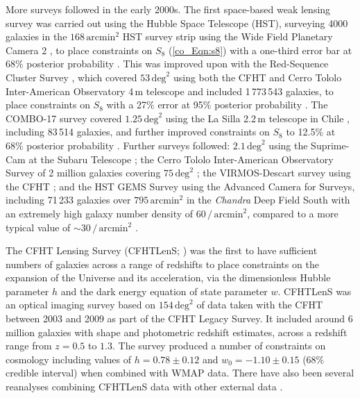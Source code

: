 More surveys followed in the early 2000s. The first space-based weak lensing survey was carried out using the Hubble Space Telescope (HST), surveying 4000 galaxies in the $168\,\text{arcmin}^2$ HST survey strip using the Wide Field Planetary Camera 2 \citep{Griffiths1990}, to place constraints on $S_8$ (\autoref{co_Eqn:s8}) with a one-third error bar at 68\% posterior probability \citep{Rhodes2001}. This was improved upon with the Red-Sequence Cluster Survey \citep{Gladders2001}, which covered $53\,\text{deg}^2$ using both the CFHT and Cerro Tololo Inter-American Observatory 4\,m telescope and included 1\,773\,543 galaxies, to place constraints on $S_8$ with a 27\% error at 95\% posterior probability \citep{Hoekstra2002a, Hoekstra2002b}. The COMBO-17 survey covered $1.25\,\text{deg}^2$ using the La Silla 2.2\,m telescope in Chile \citep{Wolf2001}, including 83\,514 galaxies, and further improved constraints on $S_8$ to 12.5\% at 68\% posterior probability \citep{Brown2003}. Further surveys followed: $2.1\,\text{deg}^2$ using the Suprime-Cam \citep{Miyazaki2002} at the Subaru Telescope \citep{Hamana2003}; the Cerro Tololo Inter-American Observatory Survey of 2 million galaxies covering $75\,\text{deg}^2$ \citep{Jarvis2003}; the VIRMOS-Descart survey using the CFHT \citep{VanWaerbeke2005}; and the HST GEMS Survey using the Advanced Camera for Surveys, including 71\,233 galaxies over $795\,\text{arcmin}^2$ in the \textit{Chandra} Deep Field South with an extremely high galaxy number density of $60\,/\,\text{arcmin}^2$, compared to a more typical value of $\sim 30\,/\,\text{arcmin}^2$ \citep{Heymans2005}.

The CFHT Lensing Survey (CFHTLenS; \citealt{Heymans2012}) was the first to have sufficient numbers of galaxies across a range of redshifts to place constraints on the expansion of the Universe and its acceleration, via the dimensionless Hubble parameter $h$ and the dark energy equation of state parameter $w$.
CFHTLenS was an optical imaging survey based on $154\,\text{deg}^2$ of data taken with the CFHT between 2003 and 2009 as part of the CFHT Legacy Survey. It included around 6 million galaxies with shape and photometric redshift estimates, across a redshift range from $z = 0.5$ to $1.3$. The survey produced a number of constraints on cosmology \citep{Kilbinger2013, Benjamin2013, Heymans2013, VanWaerbeke2013, Kitching2014, Fu2014} including values of $h = 0.78 \pm 0.12$ and $w_0 = -1.10 \pm 0.15$ (68\% credible interval) when combined with WMAP data. There have also been several reanalyses combining CFHTLenS data with other external data \citep[e.g.][]{More2015, Blake2016, Joudaki2017}.

